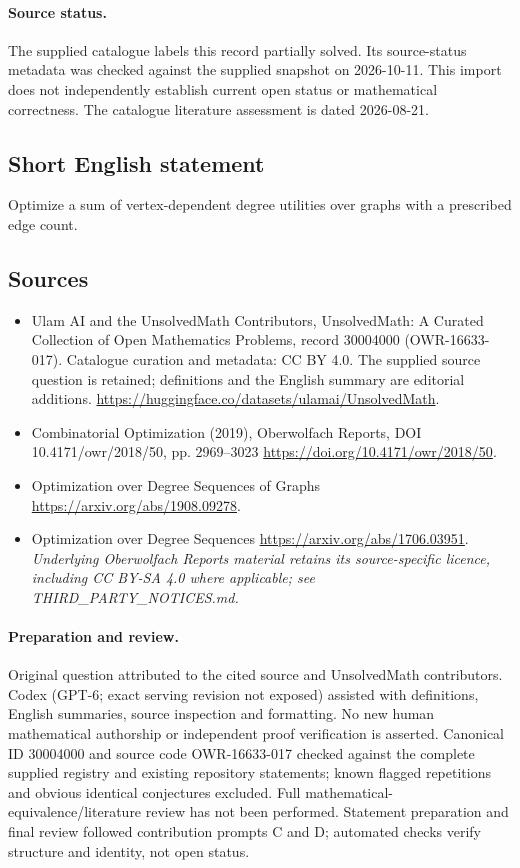 \documentclass[11pt]{article}
\begin{document}
\paragraph{Source status.}
The supplied catalogue labels this record partially solved. Its source-status metadata was checked against the supplied snapshot on 2026-10-11. This import does not independently establish current open status or mathematical correctness. The catalogue literature assessment is dated 2026-08-21.
\subsection{Short English statement}
Optimize a sum of vertex-dependent degree utilities over graphs with a prescribed edge count.
\subsection{Sources}
\begin{itemize}
\item[S1] Ulam AI and the UnsolvedMath Contributors, UnsolvedMath: A Curated Collection of Open Mathematics Problems, record 30004000 (OWR-16633-017). Catalogue curation and metadata: CC BY 4.0. The supplied source question is retained; definitions and the English summary are editorial additions.
\url{https://huggingface.co/datasets/ulamai/UnsolvedMath}.
\item[S2] Combinatorial Optimization (2019), Oberwolfach Reports, DOI 10.4171/owr/2018/50, pp. 2969--3023
\url{https://doi.org/10.4171/owr/2018/50}.
\item[S3] Optimization over Degree Sequences of Graphs
\url{https://arxiv.org/abs/1908.09278}.
\item[S4] Optimization over Degree Sequences
\url{https://arxiv.org/abs/1706.03951}.
\textit{Underlying Oberwolfach Reports material retains its source-specific licence, including CC BY-SA 4.0 where applicable; see THIRD\_PARTY\_NOTICES.md.}
\end{itemize}
\paragraph{Preparation and review.}
Original question attributed to the cited source and UnsolvedMath contributors. Codex (GPT-6; exact serving revision not exposed) assisted with definitions, English summaries, source inspection and formatting. No new human mathematical authorship or independent proof verification is asserted. Canonical ID 30004000 and source code OWR-16633-017 checked against the complete supplied registry and existing repository statements; known flagged repetitions and obvious identical conjectures excluded. Full mathematical-equivalence/literature review has not been performed. Statement preparation and final review followed contribution prompts C and D; automated checks verify structure and identity, not open status.
\label{end:30004000}
\end{document}
